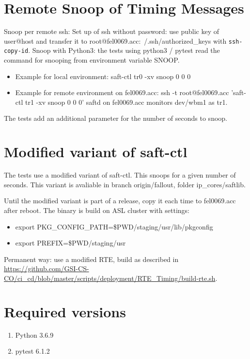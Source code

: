 \documentclass[12pt,a4paper]{report}
\begin{document}
\section{Remote Snoop of Timing Messages}
Snoop per remote ssh: Set up of ssh without password: use public key of user@host and transfer it to root@fel0069.acc:~/.ssh/authorized\_keys with \texttt{ssh-copy-id}.
Snoop with Python3: the tests using python3 / pytest read the command for snooping from environment variable SNOOP.
\begin{itemize}
\item Example for local environment: saft-ctl tr0 -xv snoop 0 0 0
\item Example for remote environment on fel0069.acc: ssh -t root@fel0069.acc 'saft-ctl tr1 -xv snoop 0 0 0' \linebreak
saftd on fel0069.acc monitors dev/wbm1 as tr1.
\end{itemize}
The tests add an additional parameter for the number of seconds to snoop.

\section{Modified variant of saft-ctl}
The tests use a modified variant of saft-ctl. This snoops for a given number of seconds. This variant is avaliable in branch origin/fallout, folder ip\_cores/saftlib.

Until the modified variant is part of a release, copy it each time to fel0069.acc after reboot. The binary is build on ASL cluster with settings:
\begin{itemize}
\item export PKG\_CONFIG\_PATH=\$PWD/staging/usr/lib/pkgconfig
\item export PREFIX=\$PWD/staging/usr
\end{itemize}

Permanent way: use a modified RTE, build as described in
\url{https://github.com/GSI-CS-CO/ci\_cd/blob/master/scripts/deployment/RTE\_Timing/build-rte.sh}.

\section{Required versions}
\begin{enumerate}
\item Python 3.6.9
\item pytest 6.1.2
\end{enumerate}
\end{document}
